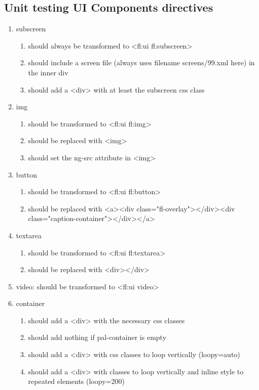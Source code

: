 \begin{singlespace}
\section{Unit testing UI Components directives}
\begin{enumerate}
\item     subscreen
\begin{enumerate}
\item         should always be transformed to <fl:ui fl:subscreen>
\item         should include a screen file (always uses filename screens/99.xml here) in the inner div
\item         should add a <div> with at least the subscreen css class
\end{enumerate}
\item     img
\begin{enumerate}
\item         should be transformed to <fl:ui fl:img>
\item         should be replaced with <img>
\item         should set the ng-src attribute in <img>
\end{enumerate}
\item     button
\begin{enumerate}
\item         should be transformed to <fl:ui fl:button>
\item         should be replaced with <a><div class="fl-overlay"></div><div class="caption-container"></div></a>
\end{enumerate}
\item     textarea
\begin{enumerate}
\item         should be transformed to <fl:ui fl:textarea>
\item         should be replaced with <div></div>
\end{enumerate}
\item     video: should be transformed to <fl:ui video>
\item     container
\begin{enumerate}
\item         should add a <div> with the necessary css classes
\item         should add nothing if pal-container is empty
\item         should add a <div> with css classes to loop vertically (loopy=auto)
\item         should add a <div> with classes to loop vertically and inline style to repeated elements (loopy=200)

\end{enumerate}
\end{enumerate}
\end{singlespace}
